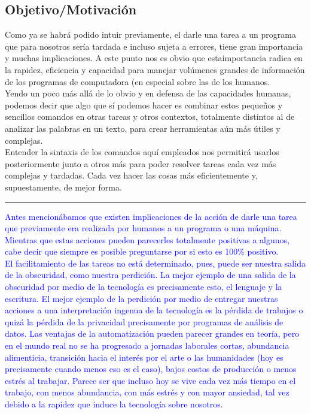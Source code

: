 \documentclass[15pt]{article}
\begin{document}
\subsection*{Objetivo/Motivación}

Como ya se habrá podido intuir previamente, el darle una tarea a un programa que para nosotros sería tardada e incluso sujeta a errores, tiene gran importancia y muchas implicaciones. A este punto nos es obvio que estaimportancia radica en la rapidez, eficiencia y capacidad para manejar volúmenes grandes de información de los programas de computadora (en especial sobre las de los humanos.\\

Yendo un poco más allá de lo obvio y en defensa de las capacidades humanas, podemos decir que algo que sí podemos hacer es combinar estos pequeños y sencillos comandos en otras tareas y otros contextos, totalmente distintos al de analizar las palabras en un texto, para crear herramientas aún más útiles y complejas. \\

Entender la sintaxis de los comandos aquí empleados nos permitirá usarlos posteriormente junto a otros más para poder resolver tareas cada vez más complejas y tardadas. Cada vez hacer las cosas más eficientemente y, supuestamente, de mejor forma.\\

\hspace{-15pt}\textcolor{Blue}{\rule{18.5cm}{1pt}}
\vspace{3pt}

\textcolor{Blue}{Antes mencionábamos que existen implicaciones de la acción de darle una tarea que previamente era realizada por humanos a un programa o una máquina. Mientras que estas acciones pueden parecerles totalmente positivas a algunos, cabe decir que siempre es posible preguntarse por si esto es 100\% positivo.} \\

\textcolor{Blue}{El facilitamiento de las tareas no está determinado, pues, puede ser nuestra salida de la obscuridad, como nuestra perdición. La mejor ejemplo de una salida de la obscuridad por medio de la tecnología es precisamente esto, el lenguaje y la escritura. El mejor ejemplo de la perdición por medio de entregar nuestras acciones a una interpretación ingenua de la tecnología es la pérdida de trabajos o quizá la pérdida de la privacidad precisamente por programas de análisis de datos. Las ventajas de la automatización pueden parecer grandes en teoría, pero en el mundo real no se ha progresado a jornadas laborales cortas, abundancia alimenticia, transición hacia el interés por el arte o las humanidades (hoy es precisamente cuando menos eso es el caso), bajos costos de producción o menos estrés al trabajar. Parece ser que incluso hoy se vive cada vez más tiempo en el trabajo, con menos abundancia, con más estrés y con mayor ansiedad, tal vez debido a la rapidez que induce la tecnología sobre nosotros.}\\
\end{document}
